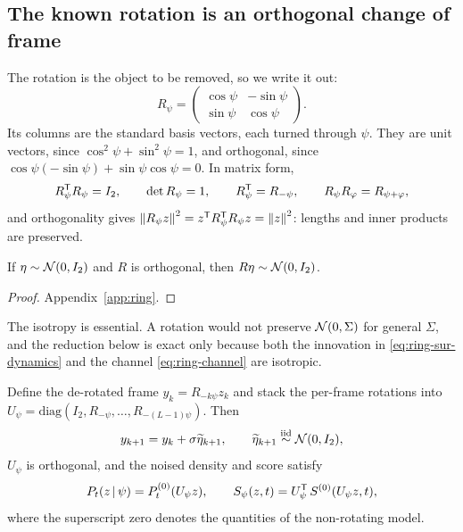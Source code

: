 \subsection{The known rotation is an orthogonal change of frame}

The rotation is the object to be removed, so we write it out:
\begin{equation}
  R_\psi =
  \begin{pmatrix} \cos\psi & -\sin\psi \\ \sin\psi & \cos\psi \end{pmatrix} .
  \label{eq:ring-rotation}
\end{equation}
Its columns are the standard basis vectors, each turned through $\psi$. They
are unit vectors, since $\cos^2\psi + \sin^2\psi = 1$, and orthogonal, since
$\cos\psi(-\sin\psi) + \sin\psi\cos\psi = 0$. In matrix form,
\begin{equation}
  R_\psi^{\mathsf{T}} R_\psi = I_2, \qquad \det R_\psi = 1, \qquad
  R_\psi^{\mathsf{T}} = R_{-\psi}, \qquad R_\psi R_\varphi = R_{\psi+\varphi} ,
  \label{eq:ring-rot-props}
\end{equation}
and orthogonality gives
$\left\lVert R_\psi z \right\rVert^2 = z^{\mathsf{T}} R_\psi^{\mathsf{T}} R_\psi z = \left\lVert z \right\rVert^2$: lengths and
inner products are preserved.

\begin{lemma}
\label{lem:ring-isotropy}
If $\eta \sim \mathcal{N}(0, I_2)$ and $R$ is orthogonal, then $R\eta \sim \mathcal{N}(0,I_2)$.
\end{lemma}

\begin{proof}
Appendix~\ref{app:ring}.
\end{proof}

The isotropy is essential. A rotation would not preserve $\mathcal{N}(0,\Sigma)$ for
general $\Sigma$, and the reduction below is exact only because both the
innovation in \eqref{eq:ring-sur-dynamics} and the channel
\eqref{eq:ring-channel} are isotropic.

\begin{lemma}\label{lem:ring-gauge}
Define the de-rotated frame $y_k = R_{-k\psi} z_k$ and stack the per-frame
rotations into
$U_\psi = \mathrm{diag}(I_2, R_{-\psi}, \dots, R_{-(L-1)\psi})$. Then
\begin{equation}
  y_{k+1} = y_k + \sigma \widetilde\eta_{k+1} ,
  \qquad \widetilde\eta_{k+1} \stackrel{\text{iid}}{\sim} \mathcal{N}(0, I_2) ,
  \label{eq:ring-gauged-rw}
\end{equation}
$U_\psi$ is orthogonal, and the noised density and score satisfy
\begin{equation}
  P_t(z \,|\, \psi) = P^{(0)}_t(U_\psi z) ,
  \qquad
  S_\psi(z,t) = U_\psi^{\mathsf{T}}\, S^{(0)}(U_\psi z, t) ,
  \label{eq:ring-gauge-score}
\end{equation}
where the superscript zero denotes the quantities of the non-rotating model.
\end{lemma}

